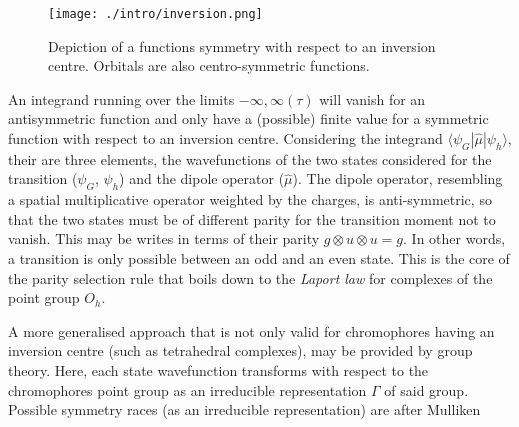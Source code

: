 			\begin{figure}[h]
				\centering
				\label{fig:inversion}
				\texttt{[image: ./intro/inversion.png]}
				\caption{Depiction of a functions symmetry with respect to an inversion centre. Orbitals are also centro-symmetric functions.}
			\end{figure}

			An integrand running over the limits $-\infty,\infty (\tau)$ will vanish for an antisymmetric function and only have a (possible) finite value for a symmetric function with respect to an inversion centre.
			Considering the integrand $\langle\psi_G|\hat{\mu}|\psi_h\rangle$, their are three elements, the wavefunctions of the two states considered for the transition ($\psi_G$, $\psi_h$) and the dipole operator ($\hat{\mu}$). The dipole operator, resembling a spatial multiplicative operator weighted by the charges, is anti-symmetric, so that the two states must be of different parity for the transition moment not to vanish. This may be writes in terms of their parity $g \otimes u \otimes u = g$.  In other words, a transition is only possible between an odd and an even state. This is the core of the parity selection rule that boils down to the \emph{Laport law} for complexes of the point group $O_h$.

			A more generalised approach that is not only valid for chromophores having an inversion centre (such as tetrahedral complexes), may be provided by group theory. Here, each state wavefunction transforms with respect to the chromophores point group as an irreducible representation $\Gamma$ of said group. Possible symmetry races (as an irreducible representation) are after Mulliken

